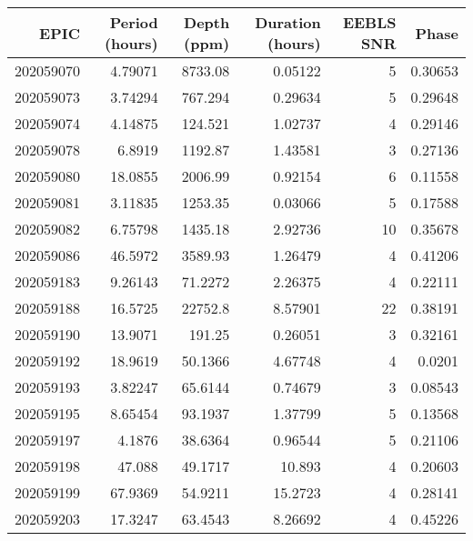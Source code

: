 \begin{tabular}{rrrrrr}
\hline
      EPIC &   Period (hours) &   Depth (ppm) &   Duration (hours) &   EEBLS SNR &   Phase \\
\hline
 202059070 &          4.79071 &     8733.08   &            0.05122 &           5 & 0.30653 \\
 202059073 &          3.74294 &      767.294  &            0.29634 &           5 & 0.29648 \\
 202059074 &          4.14875 &      124.521  &            1.02737 &           4 & 0.29146 \\
 202059078 &          6.8919  &     1192.87   &            1.43581 &           3 & 0.27136 \\
 202059080 &         18.0855  &     2006.99   &            0.92154 &           6 & 0.11558 \\
 202059081 &          3.11835 &     1253.35   &            0.03066 &           5 & 0.17588 \\
 202059082 &          6.75798 &     1435.18   &            2.92736 &          10 & 0.35678 \\
 202059086 &         46.5972  &     3589.93   &            1.26479 &           4 & 0.41206 \\
 202059183 &          9.26143 &       71.2272 &            2.26375 &           4 & 0.22111 \\
 202059188 &         16.5725  &    22752.8    &            8.57901 &          22 & 0.38191 \\
 202059190 &         13.9071  &      191.25   &            0.26051 &           3 & 0.32161 \\
 202059192 &         18.9619  &       50.1366 &            4.67748 &           4 & 0.0201  \\
 202059193 &          3.82247 &       65.6144 &            0.74679 &           3 & 0.08543 \\
 202059195 &          8.65454 &       93.1937 &            1.37799 &           5 & 0.13568 \\
 202059197 &          4.1876  &       38.6364 &            0.96544 &           5 & 0.21106 \\
 202059198 &         47.088   &       49.1717 &           10.893   &           4 & 0.20603 \\
 202059199 &         67.9369  &       54.9211 &           15.2723  &           4 & 0.28141 \\
 202059203 &         17.3247  &       63.4543 &            8.26692 &           4 & 0.45226 \\

\end{tabular}
